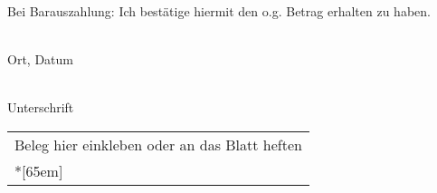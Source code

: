 \documentclass[ngerman,a4wide]{scrartcl}
\begin{document}
\begin{Form}
\begin{tabular}{|rl|}
&\\
\hline
\end{tabular}

\vspace{2cm}

\hfill
\begin{minipage}{7cm}


Bei Barauszahlung: Ich bestätige hiermit den o.g. Betrag erhalten zu haben.
\vspace{1cm}

\hfill
\begin{minipage}{7cm}
 \dotfill\\
 Ort, Datum
\end{minipage}

\vspace{1cm}

\hfill
\begin{minipage}{7cm}
 \dotfill\\
 Unterschrift
\end{minipage}

\end{minipage}

\vspace{-16cm}
\begin{tabular}{|p{8cm}|}
\hline
Beleg hier einkleben oder an das Blatt heften\\
*[65em] \\
\hline
\end{tabular}



\vfill





\end{Form}
\end{document}
